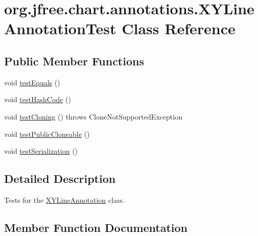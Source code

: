 \hypertarget{classorg_1_1jfree_1_1chart_1_1annotations_1_1_x_y_line_annotation_test}{}\section{org.\+jfree.\+chart.\+annotations.\+X\+Y\+Line\+Annotation\+Test Class Reference}
\label{classorg_1_1jfree_1_1chart_1_1annotations_1_1_x_y_line_annotation_test}
\subsection*{Public Member Functions}
\begin{DoxyCompactItemize}
\item 
void \mbox{\hyperlink{classorg_1_1jfree_1_1chart_1_1annotations_1_1_x_y_line_annotation_test_aa8d57abab2d5f9df522e425e2344f2a0}{test\+Equals}} ()
\item 
void \mbox{\hyperlink{classorg_1_1jfree_1_1chart_1_1annotations_1_1_x_y_line_annotation_test_afb36bd9713682578f6c4e24f87954d37}{test\+Hash\+Code}} ()
\item 
void \mbox{\hyperlink{classorg_1_1jfree_1_1chart_1_1annotations_1_1_x_y_line_annotation_test_a747e4b1e489a03a55c004695883125bd}{test\+Cloning}} ()  throws Clone\+Not\+Supported\+Exception 
\item 
void \mbox{\hyperlink{classorg_1_1jfree_1_1chart_1_1annotations_1_1_x_y_line_annotation_test_a63af6ec93c9b02b1ef3e08b3b0d09aa3}{test\+Public\+Cloneable}} ()
\item 
void \mbox{\hyperlink{classorg_1_1jfree_1_1chart_1_1annotations_1_1_x_y_line_annotation_test_af52cf9b96badbddad45277761974d415}{test\+Serialization}} ()
\end{DoxyCompactItemize}


\subsection{Detailed Description}
Tests for the \mbox{\hyperlink{classorg_1_1jfree_1_1chart_1_1annotations_1_1_x_y_line_annotation}{X\+Y\+Line\+Annotation}} class. 

\subsection{Member Function Documentation}
\mbox{\label{classorg_1_1jfree_1_1chart_1_1annotations_1_1_x_y_line_annotation_test_a747e4b1e489a03a55c004695883125bd}} 
